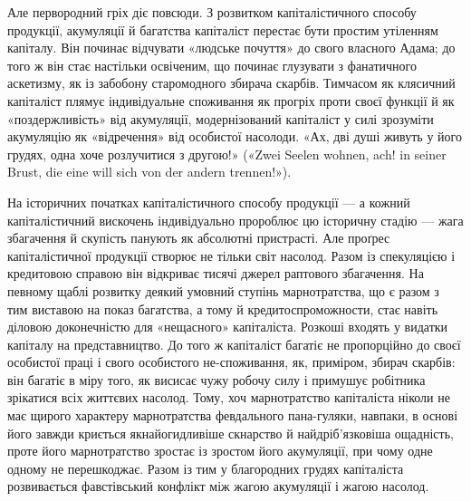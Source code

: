 Але первородний гріх діє повсюди. З розвитком капіталістичного
способу продукції, акумуляції й багатства капіталіст
перестає бути простим утіленням капіталу. Він починає відчувати
«людське почуття» до свого власного Адама; до того ж він
стає настільки освіченим, що починає глузувати з фанатичного
аскетизму, як із забобону старомодного збирача скарбів. Тимчасом
як клясичний капіталіст плямує індивідуальне споживання
як прогріх проти своєї функції й як «поздержливість» від
акумуляції, модернізований капіталіст у силі зрозуміти акумуляцію
як «відречення» від особистої насолоди. «Ах, дві душі
живуть у його грудях, одна хоче розлучитися з другою!» («Zwei
Seelen wohnen, ach! in seiner Brust, die eine will sich von der
andern trennen!»).

На історичних початках капіталістичного способу продукції —
а кожний капіталістичний вискочень індивідуально пророблює
цю історичну стадію — жага збагачення й скупість панують як
абсолютні пристрасті. Але проґрес капіталістичної продукції
створює не тільки світ насолод. Разом із спекуляцією і кредитовою
справою він відкриває тисячі джерел раптового збагачення. На
певному щаблі розвитку деякий умовний ступінь марнотратства,
що є разом з тим виставою на показ багатства, а тому й кредитоспроможности,
стає навіть діловою доконечністю для «нещасного»
капіталіста. Розкоші входять у видатки капіталу на представництво.
До того ж капіталіст багатіє не пропорційно до своєї особистої
праці і свого особистого не-споживання, як, приміром,
збирач скарбів: він багатіє в міру того, як висисає чужу робочу
силу і примушує робітника зрікатися всіх життєвих насолод.
Тому, хоч марнотратство капіталіста ніколи не має щирого
характеру марнотратства февдального пана-гуляки, навпаки,
в основі його завжди криється якнайогидливіше скнарство й
найдріб’язковіша ощадність, проте його марнотратство зростає
із зростом його акумуляції, при чому одне одному не перешкоджає.
Разом із тим у благородних грудях капіталіста розвивається
фавстівський конфлікт між жагою акумуляції і жагою насолод.
